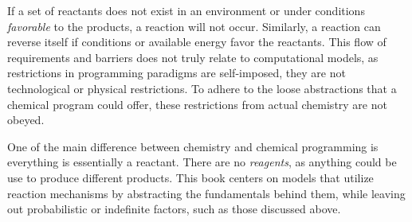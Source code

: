 \par If a set of reactants does not exist in an environment or under conditions \textit{favorable} to the products, a reaction will not occur. Similarly, a reaction can reverse itself if conditions or available energy favor the reactants. This flow of requirements and barriers does not truly relate to computational models, as restrictions in programming paradigms are self-imposed, they are not technological or physical restrictions. To adhere to the loose abstractions that a chemical program could offer, these restrictions from actual chemistry are not obeyed. 

\par One of the main difference between chemistry and chemical programming is everything is essentially a reactant. There are no \textit{reagents}, as anything could be use to produce different products. This book centers on models that utilize reaction mechanisms by abstracting the fundamentals behind them, while leaving out probabilistic or indefinite factors, such as those discussed above.